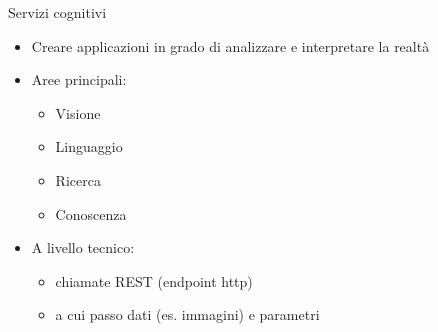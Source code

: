 %
\begin{frame}[t]{Servizi cognitivi}
\begin{itemize}
	\item Creare applicazioni in grado di analizzare e interpretare la realtà
	\item Aree principali:
	\begin{itemize}
		\item Visione
		\item Linguaggio
		\item Ricerca
		\item Conoscenza
	\end{itemize}
	\item A livello tecnico:
	\begin{itemize}
		\item chiamate REST (endpoint http)
		\item a cui passo dati (es. immagini) e parametri
	\end{itemize}
\end{itemize}
\end{frame}
%

